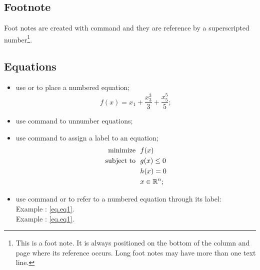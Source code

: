 \documentclass[report,english]{enacom}
\begin{document}
\subsection{Footnote}
	Foot notes are created with command  and they are reference by a superscripted number\footnote{This is a foot note. It is always positioned on the bottom of the column and page where its reference occurs. Long foot notes may have more than one text line.}.


\subsection{Equations}
    \begin{itemize}
        \item use  or  to place a numbered equation;
        \begin{equation}\label{eq.Series}
            f(x) = x_1 + \frac{x_3^3}{3} + \frac{x_5^5}{5};
        \end{equation}		
        \item use command  to unnumber equations;
        \item use command  to assign a label to an equation;
        \begin{align}
            \operatorname{minimize~~} & f(x)\label{eq.eq1}\\
        \operatorname{subject~to~~} & g(x) \leq 0\label{eq.eq2}\\
            & h(x) = 0\label{eq.eq3}\\
            & x \in \mathbb{R}^n\label{eq.eq4};
        \end{align}
        \item use command  or  to refer to a numbered equation through its label:\\
        Example : \eqref{eq.eq1}. \\
        Example : \autoref{eq.eq1}.  
    \end{itemize}
\end{document}
